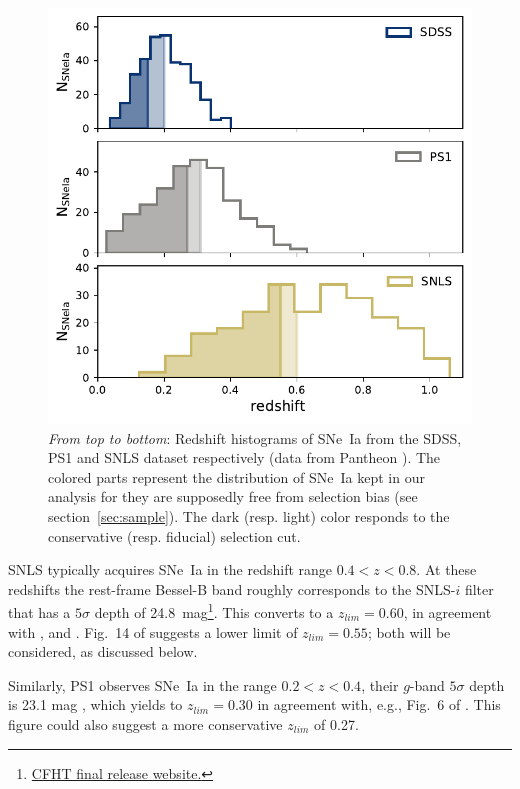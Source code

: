 \documentclass[]{aa} %
\begin{document}
\begin{figure}
    \centering
    \includegraphics[width=0.95\linewidth]{Article_figures/hist_surveys_cuts_55-cividis.pdf}
    \caption{\textit{From top to bottom}: Redshift histograms of SNe~Ia  from
        the SDSS, PS1 and SNLS dataset respectively (data from  Pantheon
        \citealt{scolnic2018a}).  The colored parts represent the distribution
        of SNe~Ia kept in our analysis for they are supposedly free from
        selection bias (see section~\ref{sec:sample}). The dark (resp. light)
    color responds to the conservative (resp. fiducial) selection cut.}
    \label{fig:cuts}
\end{figure}

SNLS typically acquires SNe~Ia in the redshift range $0.4<z<0.8$. At these
redshifts the rest-frame Bessel-B band roughly corresponds to the SNLS-$i$
filter that has a $5\sigma$ depth of
24.8~mag\footnote{\href{https://www.cfht.hawaii.edu/Science/CFHTLS/cfhtlsfinalreleaseexecsummary.html}{CFHT
final release website.}}. This converts to a $z_{lim}=0.60$, in agreement with
\cite{neill2006}, \cite{perrett2010} and \cite{bazin2011}.  Fig.~14 of
\citealt{perrett2010} suggests a lower limit of $z_{lim}=0.55$; both will be
considered, as discussed below.

Similarly, PS1 observes SNe~Ia in the range $0.2<z<0.4$, their $g$-band
$5\sigma$ depth is 23.1 mag \citep{rest2014}, which yields to $z_{lim}=0.30$ in
agreement with, e.g., Fig.~6 of \cite{scolnic2018a}. This figure could also
suggest a more conservative $z_{lim}$ of 0.27.
\end{document}

